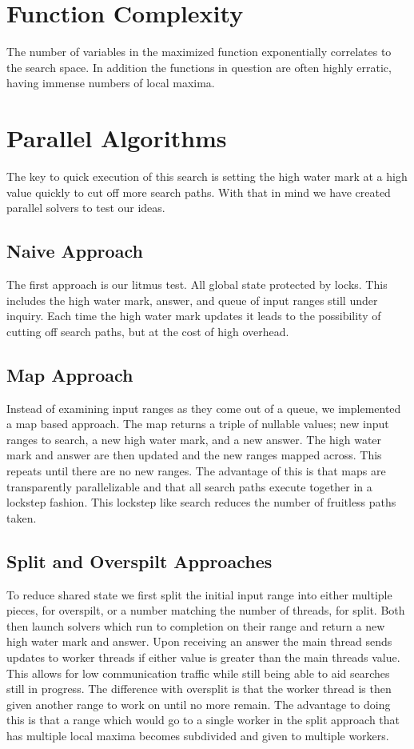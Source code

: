 \documentclass{acm_proc_article-sp}
\begin{document}
\section{Function Complexity}
The number of variables in the maximized function exponentially correlates to the search space. In addition the functions in question are often highly erratic, having immense numbers of local maxima.

\section{Parallel Algorithms}
The key to quick execution of this search is setting the high water mark at a high value quickly to cut off more search paths. With that in mind we have created parallel solvers to test our ideas.

\subsection{Naive Approach}
The first approach is our litmus test. All global state protected by locks. This includes the high water mark, answer, and queue of input ranges still under inquiry. Each time the high water mark updates it leads to the possibility of cutting off search paths, but at the cost of high overhead.

\subsection{Map Approach}
Instead of examining input ranges as they come out of a queue, we implemented a map based approach. The map returns a triple of nullable values; new input ranges to search, a new high water mark, and a new answer. The high water mark and answer are then updated and the new ranges mapped across. This repeats until there are no new ranges. The advantage of this is that maps are transparently parallelizable and that all search paths execute together in a lockstep fashion. This lockstep like search reduces the number of fruitless paths taken.

\subsection{Split and Overspilt Approaches}
To reduce shared state we first split the initial input range into either multiple pieces, for overspilt, or a number matching the number of threads, for split. Both then launch solvers which run to completion on their range and return a new high water mark and answer. Upon receiving an answer the main thread sends updates to worker threads if either value is greater than the main threads value. This allows for low communication traffic while still being able to aid searches still in progress. The difference with oversplit is that the worker thread is then given another range to work on until no more remain. The advantage to doing this is that a range which would go to a single worker in the split approach that has multiple local maxima becomes subdivided and given to multiple workers.  
\end{document}

